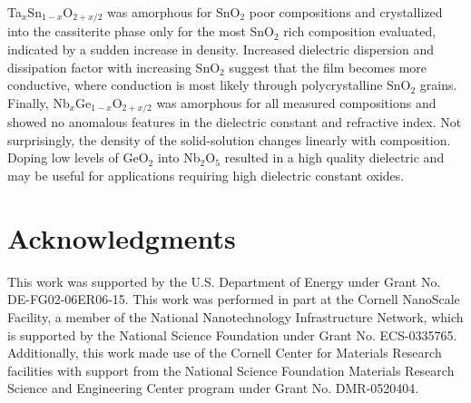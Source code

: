 Ta$_{x}$Sn$_{1-x}$O$_{2+x/2}$ was amorphous for SnO$_{2}$ poor compositions and crystallized into the cassiterite phase only for the most SnO$_{2}$ rich composition evaluated, indicated by a sudden increase in density. Increased dielectric dispersion and dissipation factor with increasing SnO$_{2}$ suggest that the film becomes more conductive, where conduction is most likely through polycrystalline SnO$_{2}$ grains. Finally, Nb$_{x}$Ge$_{1-x}$O$_{2+x/2}$ was amorphous for all measured compositions and showed no anomalous features in the dielectric constant and refractive index. Not surprisingly, the density of the solid-solution changes linearly with composition. Doping low levels of GeO$_{2}$ into Nb$_{2}$O$_{5}$ resulted in a high quality dielectric and may be useful for applications requiring high dielectric constant oxides.

\section{Acknowledgments}
This work was supported by the U.S. Department of Energy under Grant No. DE-FG02-06ER06-15. This work was performed in part at the Cornell NanoScale Facility, a member of the National Nanotechnology Infrastructure Network, which is supported by the National Science Foundation under Grant No. ECS-0335765. Additionally, this work made use of the Cornell Center for Materials Research facilities with support from the National Science Foundation Materials Research Science and Engineering Center program under Grant No. DMR-0520404.

